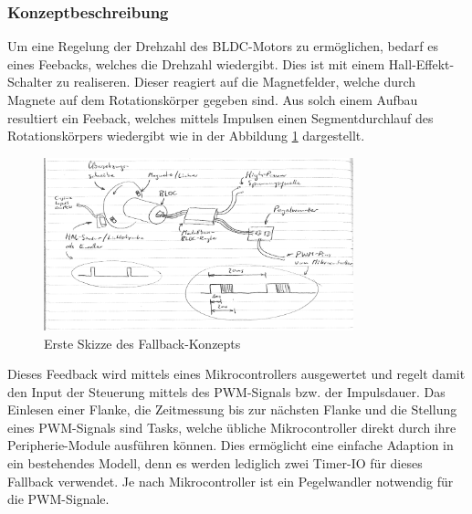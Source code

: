 \subsubsection{Konzeptbeschreibung}
\fi
Um eine Regelung der Drehzahl des BLDC-Motors zu ermöglichen, bedarf es eines
Feebacks, welches die Drehzahl wiedergibt. Dies ist mit einem
Hall-Effekt-Schalter zu realiseren. Dieser reagiert auf die Magnetfelder,
welche durch Magnete auf dem Rotationskörper gegeben sind. Aus solch einem
Aufbau resultiert ein Feeback, welches mittels Impulsen einen Segmentdurchlauf
des Rotationskörpers wiedergibt wie in der Abbildung \ref{fig:fallback-sketch}
dargestellt.
\ifSTANDALONE
\begin{figure}[h!]
	\centering
	\includegraphics[width=0.8\textwidth]{../src/Bilder/fallback_sketch_1.pdf}
	\caption{Erste Skizze des Fallback-Konzepts}
	\label{fig:fallback-sketch}
\end{figure}
\fi
Dieses Feedback wird mittels eines Mikrocontrollers ausgewertet und regelt
damit den Input der Steuerung mittels des PWM-Signals bzw. der Impulsdauer.
Das Einlesen einer Flanke, die Zeitmessung bis zur nächsten Flanke und die
Stellung eines PWM-Signals sind Tasks, welche übliche Mikrocontroller direkt
durch ihre Peripherie-Module ausführen können. Dies ermöglicht eine einfache
Adaption in ein bestehendes Modell, denn es werden lediglich zwei Timer-IO
für dieses Fallback verwendet. Je nach Mikrocontroller ist ein Pegelwandler
notwendig für die PWM-Signale.
